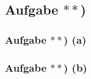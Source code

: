 \subsection*{Aufgabe $\ast\ast$)}
\subsubsection*{Aufgabe $\ast\ast$) (a)}


\subsubsection*{Aufgabe $\ast\ast$) (b)}



